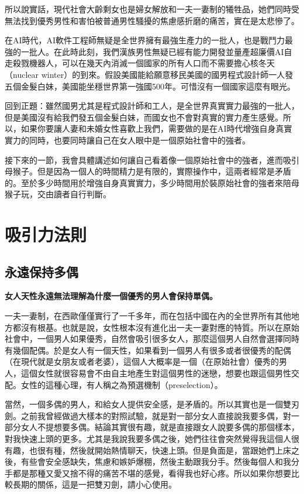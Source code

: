 所以說實話，現代社會大齡剩女也是婦女解放和一夫一妻制的犧牲品，她們同時受無法找到優秀男性和害怕被普通男性騷擾的焦慮感折磨的痛苦，實在是太悲慘了。

在AI時代，AI軟件工程師無疑是全世界擁有最強生產力的一批人，也是戰鬥力最強的一批人。在此時此刻，我們漢族男性無疑已經有能力開發並量產超廉價AI自走殺戮機器人，可以在幾天內消滅一個國家的所有人口而不需要擔心核冬天（nuclear winter）的到來。假設美國能給願意移民美國的國男程式設計師一人發五個金髮白妹，美國能坐穩世界第一強國500年。可惜沒有一個國家這麼有眼光。

回到正題：雖然國男尤其是程式設計師和工人，是全世界真實實力最強的一批人，但是美國沒有給我們發五個金髮白妹，而國女也不會對真實的實力產生感覺。所以，如果你要讓人妻和未婚女性喜歡上我們，需要做的是在AI時代增強自身真實實力的同時，也要同時讓自己在女人眼中是一個原始社會中的強者。

接下來的一節，我會具體講述如何讓自己看着像一個原始社會中的強者，進而吸引母猴子。但是因為一個人的時間精力是有限的，實際操作中，這兩者經常是矛盾的。至於多少時間用於增強自身真實實力，多少時間用於裝原始社會的強者來陪母猴子玩，交由讀者自行判斷。

\section{吸引力法則}

\subsection{永遠保持多偶}

\textbf{女人天性永遠無法理解為什麼一個優秀的男人會保持單偶。}

一夫一妻制，在西歐僅僅實行了一千多年，而在包括中國在內的全世界所有其他地方都沒有根基。也就是說，女性根本沒有進化出一夫一妻對應的特質。所以在原始社會中，一個男人如果優秀，自然會吸引很多女人，那麼這個男人自然會選擇同時有幾個配偶。於是女人有一個天性，如果看到一個男人有很多或者很優秀的配偶（在現代就是女朋友或者老婆），這個人大概率是一個（在原始社會）優秀的男人，這個女性就很容易會不由自主地產生對這個男性的迷戀，想要也跟這個男性交配。女性的這種心理，有人稱之為預選機制（preselection）。

當然，一個多偶的男人，和給女人提供安全感，是矛盾的。所以其實也是一個雙刃劍。之前我曾經做過大樣本的對照試驗，就是對一部分女人直接說我要多偶，對一部分女人不提想要多偶。結論其實很有趣，就是直接跟女人說要多偶的那個樣本，對我快速上頭的更多。尤其是我說我要多偶之後，她們往往會突然覺得我這個人很有趣，也很有種，然後就開始熱情聊天，快速上頭。但是負面是，當跟她們上床之後，有些會安全感缺失，焦慮和嫉妒爆棚，然後主動跟我分手。然後每個人和我分手都是那種又愛又捨不得的痛苦不堪的感覺，看得我也好心疼。所以如果你想要比較長期的關係，這是一把雙刃劍，請小心使用。

